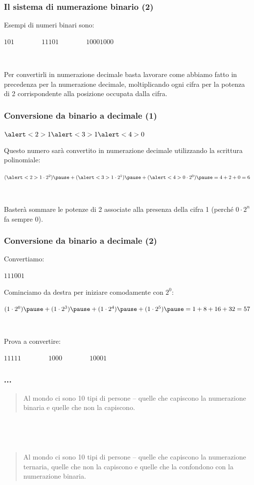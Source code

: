 \documentclass[handout]{beamer}
\begin{document}
\begin{frame}
\frametitle{Il sistema di numerazione binario (2)}
Esempi di numeri binari sono:

\begin{center}
  $ 101 \qquad\qquad 11101 \qquad\qquad 10001000 $
\end{center}\pause

~

Per convertirli in numerazione decimale basta lavorare come abbiamo fatto in precedenza per la numerazione decimale, \alert<2>{moltiplicando ogni cifra per la potenza di 2 corrispondente alla posizione occupata dalla cifra}.
\end{frame}

\begin{frame}
\frametitle{Conversione da binario a decimale (1)}
\begin{center}
  $ \alert<2>{1}\alert<3>{1}\alert<4>{0} $
\end{center}
Questo numero sarà convertito in numerazione decimale \alert<1>{utilizzando la scrittura polinomiale}:\pause
\begin{center}
  $ (\alert<2>{1} \cdot 2^2)\pause + (\alert<3>{1} \cdot 2^1)\pause + (\alert<4>{0} \cdot 2^0)\pause = 4 + 2 + 0 = 6 $
\end{center}\pause

~

Basterà sommare le potenze di 2 associate alla presenza della cifra 1 (perché $ 0 \cdot 2^n $ fa sempre 0).
\end{frame}


\begin{frame}
\frametitle{Conversione da binario a decimale (2)}
Convertiamo:
\begin{center}
  $ 111001 $
\end{center}\pause
Cominciamo da destra per iniziare comodamente con $ 2^0 $:
\begin{center}
  $ (1 \cdot 2^0)\pause + (1 \cdot 2^3)\pause + (1 \cdot 2^4)\pause + (1 \cdot 2^5)\pause = 1 + 8 + 16 + 32 = 57 $ 
\end{center}\pause

~

Prova a convertire:
\begin{center}
  $ 11111 \qquad \qquad 1000 \qquad \qquad 10001 $
\end{center}
\end{frame}


\begin{frame}
\frametitle{...}
\begin{quote}
  Al mondo ci sono 10 tipi di persone --{\pause} quelle che capiscono la numerazione binaria e quelle che non la capiscono.
\end{quote}\pause

~

~

\begin{quote}
  Al mondo ci sono 10 tipi di persone --{\pause} quelle che capiscono la numerazione ternaria, quelle che non la capiscono e quelle che la confondono con la numerazione binaria.
\end{quote}
\end{frame}
\end{document}
